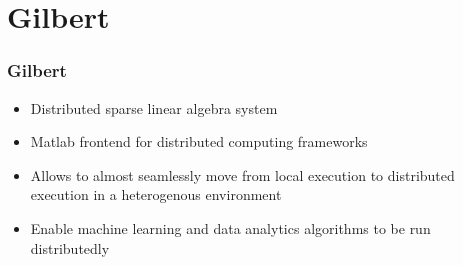 \section{Gilbert}

\begin{frame}
	\frametitle{Gilbert}
	\begin{itemize}
		\item Distributed sparse linear algebra system 
		\item Matlab frontend for distributed computing frameworks
		\item Allows to almost seamlessly move from local execution to distributed execution in a heterogenous environment
		\item Enable machine learning and data analytics algorithms to be run distributedly
	\end{itemize}
\end{frame}